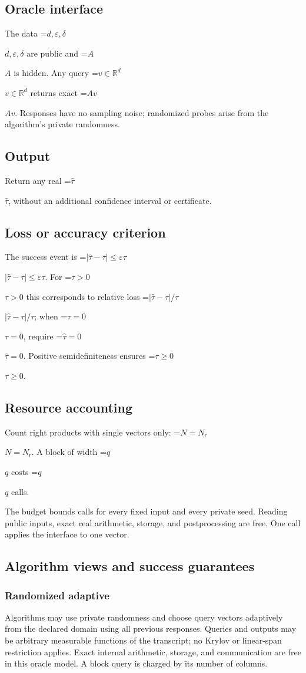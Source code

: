 \documentclass[10pt,a4paper]{article}
\newcommand{\AtlasMath}[1]{\par\begingroup\centering\setbox0=\hbox{$\displaystyle #1$}\ifdim\wd0>1.4\linewidth\typeout{ATLAS WIDE FORMULA: \the\wd0}\fi\ifdim\wd0>\linewidth\resizebox{\linewidth}{!}{\box0}\else\box0\fi\par\endgroup}
\newcommand{\AtlasInlineMath}[1]{\begingroup\setbox0=\hbox{$#1$}\ifdim\wd0>.4\linewidth\endgroup\AtlasMath{#1}\else\endgroup$#1$\fi}
\begin{document}
\subsection{Oracle interface}
The data \AtlasInlineMath{d,\varepsilon,\delta} are public and \AtlasInlineMath{A} is hidden. Any query \AtlasInlineMath{v\in\mathbb{R}^d} returns exact \AtlasInlineMath{Av}. Responses have no sampling noise; randomized probes arise from the algorithm’s private randomness.

\subsection{Output}
Return any real \AtlasInlineMath{\widehat\tau}, without an additional confidence interval or certificate.

\subsection{Loss or accuracy criterion}
The success event is \AtlasInlineMath{|\widehat\tau-\tau|\le\varepsilon\tau}. For \AtlasInlineMath{\tau>0} this corresponds to relative loss \AtlasInlineMath{|\widehat\tau-\tau|/\tau}; when \AtlasInlineMath{\tau=0}, require \AtlasInlineMath{\widehat\tau=0}. Positive semidefiniteness ensures \AtlasInlineMath{\tau\ge0}.

\subsection{Resource accounting}
Count right products with single vectors only: \AtlasInlineMath{N=N_{\mathrm r}}. A block of width \AtlasInlineMath{q} costs \AtlasInlineMath{q} calls.

The budget bounds calls for every fixed input and every private seed. Reading public inputs, exact real arithmetic, storage, and postprocessing are free. One call applies the interface to one vector.

\subsection{Algorithm views and success guarantees}
\subsubsection{Randomized adaptive}
Algorithms may use private randomness and choose query vectors adaptively from the declared domain using all previous responses. Queries and outputs may be arbitrary measurable functions of the transcript; no Krylov or linear-span restriction applies. Exact internal arithmetic, storage, and communication are free in this oracle model. A block query is charged by its number of columns.
\end{document}
